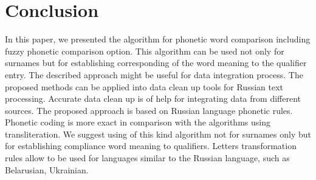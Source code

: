 \documentclass[conference,a4paper]{IEEEtran}
\begin{document}
%






\section{Conclusion}
In this paper, we presented the algorithm for phonetic word comparison including fuzzy phonetic comparison option. This algorithm can be used not only for surnames but for establishing corresponding of the word meaning to the qualifier entry. The described approach might be useful for data integration process. The proposed methods can be applied into data clean up tools for Russian text processing. Accurate data clean up is of help for integrating data from different sources.
The proposed approach is based on Russian language phonetic rules. Phonetic coding is more exact in comparison with the algorithms using transliteration. We suggest using of this kind algorithm not for surnames only but for establishing compliance word meaning to qualifiers. Letters transformation rules allow to be used for languages similar to the Russian language, such as Belarusian, Ukrainian. 
\end{document}
